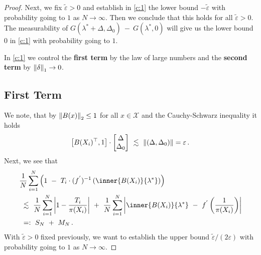 \begin{proof}
Next, we fix $
\tilde{\varepsilon}
>0
$
and establish in \eqref{c:1} the lower bound
$
-
\tilde{\varepsilon}
$
with probability going to $1$ as $N\to\infty$.
Then we conclude that this holds for all $\tilde{\varepsilon}>0$.
The measurability of
$
G
     (
     \lambda^*
      +
      \Delta
      ,
     \Delta_0
     )
     \ 
     -
     \ 
     G
     (
     \lambda^*,
     0
     )
$
will give us the lower bound 0 in \eqref{c:1} with probability going to $1$.

In \eqref{c:1} we control the \textbf{first term} by the law of large numbers 
and the \textbf{second term} by $\left\lVert\delta\right\rVert_1\to 0$.
\subsection*{First Term}
We note, that by $\left\lVert B(x)\right\rVert_2\le 1$ for all $x\in\mathcal{X}$ and the Cauchy-Schwarz inequality
it holds
\begin{gather}
  \label{c:first:0}
      \left[ 
       B(X_i)^\top,
       1
     \right]
     \cdot
     \begin{bmatrix}
       \Delta\\
       \Delta_0
     \end{bmatrix}
     \ 
     \lesssim
     \ 
     \norm{(\Delta,\Delta_0)}
     =\varepsilon
     \,.
\end{gather}
Next, we see that
\begin{align}
  \label{c:first:1}
  \begin{split}
  &
     \frac{1}{N}
     \sum_{i=1}^{N} 
     \left( 
       1
       \ 
       -
       \ 
     T_i
     \cdot
     (f^{'})^{-1}
     \left( 
       \inner
       {B(X_i)}
       {\lambda^*}
     \right)
     \right)
     \\
     &
     \ 
     \lesssim
     \ 
     \frac{1}{N}
     \sum_{i=1}^{N} 
     \left|
     1
     -
     \frac{T_i}{\pi(X_i)}
     \right|
      \ 
     +
      \ 
     \frac{1}{N}
     \sum_{i=1}^{N} 
     \left| 
        \inner
       {B(X_i)}
       {\lambda^*}
      \ 
        -
        \ 
        f^{'}
        \left( 
          \frac{1}{\pi(X_i)}
        \right)
     \right|
     \\
     &
     \ 
     =:
     \ 
     S_N
     \
     +
     \ 
     M_N
     \,.
\end{split}
\end{align}
With $
\tilde{\varepsilon}
>0
$
fixed previously,
we want to
establish the upper bound
$
\tilde{\varepsilon}
/
(2\varepsilon)
$
with probability going to $1$ as $N\to\infty$.

\end{proof}
